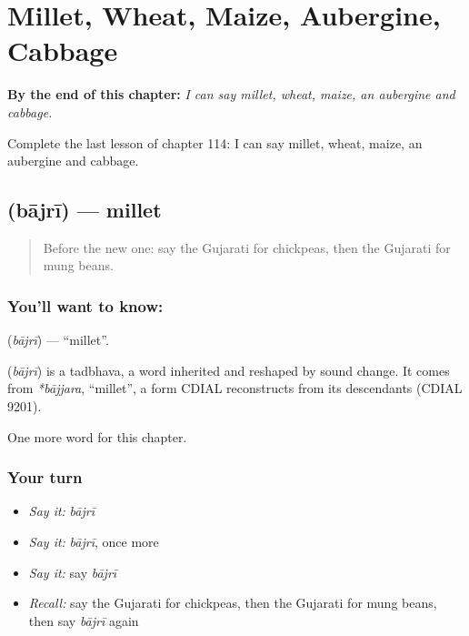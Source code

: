 
\chapter{Millet, Wheat, Maize, Aubergine, Cabbage}
\label{ch:gu-millet-wheat-maize-aubergine-cabbage}

\begin{chapteropening}
\textbf{By the end of this chapter:} \emph{I can say millet, wheat, maize, an aubergine and cabbage.}

Complete the last lesson of chapter 114: I can say millet, wheat, maize, an aubergine and cabbage.
\end{chapteropening}

\section[\texorpdfstring{\gu{બાજરી} (bājrī)}{બાજરી (bājrī)}]{ (bājrī) — millet}

\label{lesson:GU-C114-bajri}



\begin{quote}
Before the new one: say the Gujarati for chickpeas, then the Gujarati for mung beans.
\end{quote}

\subsection*{You'll want to know: }
\textbf{} (\emph{bājrī}) — \textquotedblleft{}millet\textquotedblright{}.

\begin{cousinweb}
\textbf{} (\emph{bājrī}) is a tadbhava, a word inherited and reshaped by sound change. It comes from \emph{*bājjara}, \textquotedblleft{}millet\textquotedblright{}, a form CDIAL reconstructs from its descendants (CDIAL 9201).
\end{cousinweb}

\begin{grammarlens}[title={What you've built}]
One more word for this chapter.
\end{grammarlens}

\subsection*{Your turn}
\begin{itemize}
\raggedright
  \item \emph{Say it:} \emph{bājrī}
  \item \emph{Say it:} \emph{bājrī}, once more
  \item \emph{Say it:} say \emph{bājrī}
  \item \emph{Recall:} say the Gujarati for chickpeas, then the Gujarati for mung beans, then say \emph{bājrī} again
\end{itemize}

